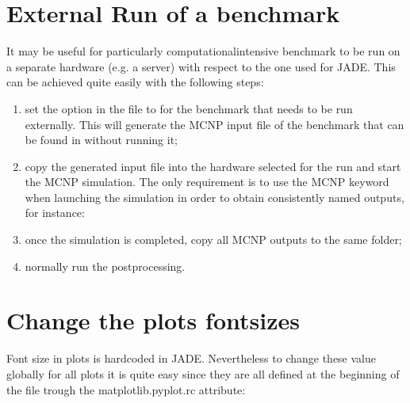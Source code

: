 \documentclass[letterpaper,10pt,english]{sphinxmanual}
\begin{document}
\section{External Run of a benchmark}
\label{\detokenize{usage/tipstricks:external-run-of-a-benchmark}}\label{\detokenize{usage/tipstricks:externalrun}}
\sphinxAtStartPar
It may be useful for particularly computational\sphinxhyphen{}intensive benchmark to be
run on a separate hardware (e.g. a server) with respect to the one used for JADE.
This can be achieved quite easily with the following steps:
\begin{enumerate}
%
\item {} 
\sphinxAtStartPar
set the  option in the 
file to  for the benchmark that needs to be run externally. This
will generate the MCNP input file of the benchmark that can be found in
without running it;

\item {} 
\sphinxAtStartPar
copy the generated input file into the hardware selected for the run and start the
MCNP simulation. The only requirement is to use the MCNP keyword  
when launching the simulation in order to obtain consistently named outputs,
for instance:

\sphinxAtStartPar
{}

\item {} 
\sphinxAtStartPar
once the simulation is completed, copy all MCNP outputs to the same
 folder;

\item {} 
\sphinxAtStartPar
normally run the post\sphinxhyphen{}processing.

\end{enumerate}


\section{Change the plots fontsizes}
\label{\detokenize{usage/tipstricks:change-the-plots-fontsizes}}
\sphinxAtStartPar
Font size in plots is hardcoded in JADE. Nevertheless to change these value globally
for all plots it is quite easy since they are all defined at the beginning of the
 file trough the matplotlib.pyplot.rc attribute:
\end{document}
